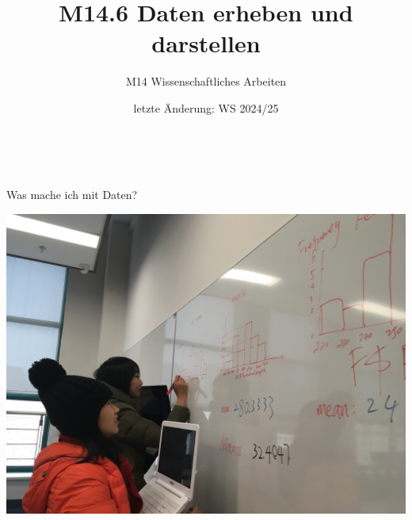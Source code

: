 \documentclass{beamer}
\title[Daten erheben und darstellen]{M14.6 Daten erheben und darstellen}
\author[melanie.stefan@medicalschool-berlin.de]{M14 Wissenschaftliches Arbeiten}
\institute[]{Prof. Melanie Stefan - melanie.stefan@medicalschool-berlin.de}
\date[]{letzte Änderung: WS 2024/25}
\begin{document}
 
  {  
\begin{frame}

 \maketitle 

$\,$\\[6cm] 

\end{frame} 
}


\begin{frame}{Was mache ich mit Daten?}

\includegraphics[width=\textwidth]{students_drawing_histograms.jpg}
    
\end{frame}
\end{document}
